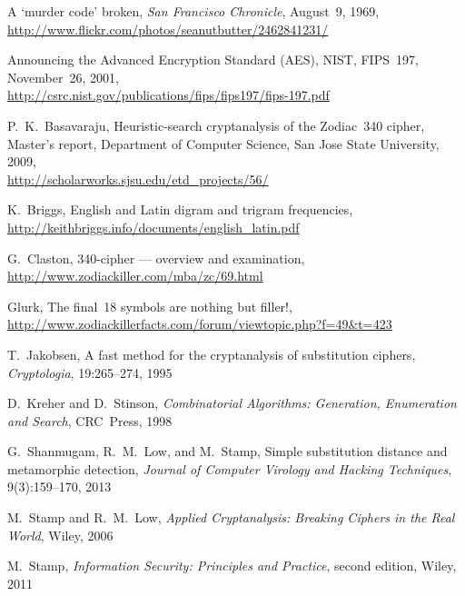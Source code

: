 %
%
%
%
\begin{thebibliography}{10}

 A `murder code' broken, {\it San Francisco Chronicle}, August~9, 1969,\\
\url{http://www.flickr.com/photos/seanutbutter/2462841231/}

 Announcing the Advanced Encryption Standard (AES), NIST, 
FIPS~197, November~26, 2001,\\
\url{http://csrc.nist.gov/publications/fips/fips197/fips-197.pdf}

 P.~K.~Basavaraju, Heuristic-search cryptanalysis of the Zodiac~340 cipher,
Master's report, Department of Computer Science, San Jose State University, 2009,\\
\url{http://scholarworks.sjsu.edu/etd_projects/56/}

 K.~Briggs, English and Latin digram and trigram frequencies,\\
\url{http://keithbriggs.info/documents/english_latin.pdf}

 G.~Claston, 340-cipher --- overview and examination,\\
\url{http://www.zodiackiller.com/mba/zc/69.html}

 Glurk, The final~18 symbols are nothing but filler!,\\
\url{http://www.zodiackillerfacts.com/forum/viewtopic.php?f=49&t=423}

 T.~Jakobsen, A fast method for the cryptanalysis of substitution ciphers,
{\it Cryptologia}, 19:265--274, 1995

 D.~Kreher and D.~Stinson, {\it Combinatorial Algorithms: 
Generation, Enumeration and Search}, CRC~Press, 1998

 G.~Shanmugam, R.~M.~Low, and M.~Stamp, 
Simple substitution distance and metamorphic detection,
{\it Journal of Computer Virology and Hacking Techniques},  9(3):159--170, 2013

 M.~Stamp and R.~M.~Low, {\it Applied Cryptanalysis: Breaking Ciphers 
in the Real World}, Wiley, 2006

 M.~Stamp, {\it Information Security: Principles and Practice}, second edition, 
Wiley, 2011

\end{thebibliography}
